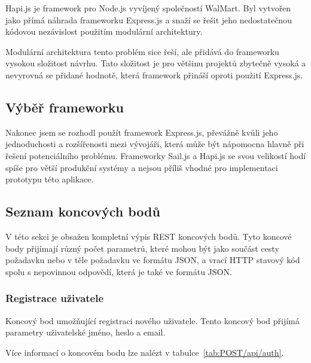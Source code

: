 Hapi.js je framework pro Node.js vyvíjený společností WalMart.
Byl vytvořen jako přímá náhrada frameworku Express.js a snaží se řešit jeho nedostatečnou kódovou nezávislost použitím modulární architektury.

Modulární architektura tento problém sice řeší, ale přidává do frameworku vysokou složitost návrhu.
Tato složitost je pro většinu projektů zbytečně vysoká a nevyrovná se přidané hodnotě, která framework přináší oproti použití Express.js.

\subsection{Výběř frameworku}\label{subsec:výběřFrameworku}

Nakonec jsem se rozhodl použít framework Express.js, převážně kvůli jeho jednoduchosti a rozšířenosti mezi vývojáři, která může být nápomocna hlavně při řešení potenciálního problému.
Frameworky Sail.js a Hapi.js se svou velikostí hodí spíše pro větší produkční systémy a nejsou příliš vhodné pro implementaci prototypu této aplikace.

\subsection{Seznam koncových bodů}\label{subsec:seznamKoncovýchBodů}

V této sekci je obsažen kompletní výpis \gls{REST} koncových bodů.
Tyto koncové body přijímají různý počet parametrů, které mohou být jako součást cesty požadavku nebo v těle požadavku ve formátu \gls{JSON}, a vrací \gls{HTTP} stavový kód spolu s nepovinnou odpovědí, která je také ve formátu \gls{JSON}.

\subsubsection{Registrace uživatele}

Koncový bod umožňující registraci nového uživatele.
Tento koncový bod přijímá parametry uživatelské jméno, heslo a email.

Více informací o koncovém bodu lze nalézt v tabulce~\ref{tab:POST/api/auth}.

